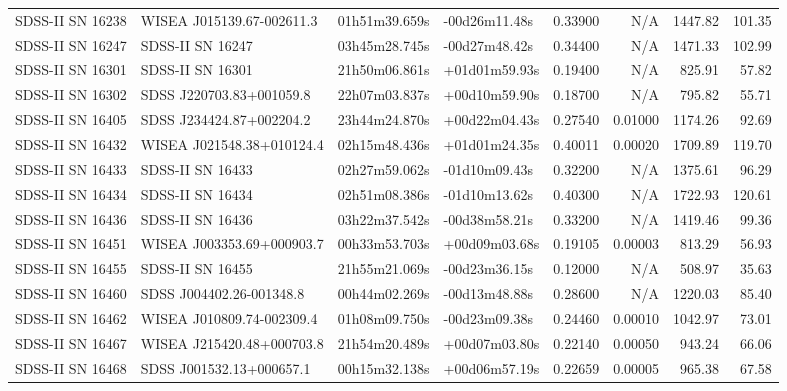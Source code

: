 \begin{longtable}{llllrrrr}
SDSS-II SN 16238 &       WISEA J015139.67-002611.3 &   01h51m39.659s &   -00d26m11.48s &  0.33900 &      N/A &  1447.82 &      101.35 \\
SDSS-II SN 16247 &                SDSS-II SN 16247 &   03h45m28.745s &   -00d27m48.42s &  0.34400 &      N/A &  1471.33 &      102.99 \\
SDSS-II SN 16301 &                SDSS-II SN 16301 &   21h50m06.861s &   +01d01m59.93s &  0.19400 &      N/A &   825.91 &       57.82 \\
SDSS-II SN 16302 &        SDSS J220703.83+001059.8 &   22h07m03.837s &   +00d10m59.90s &  0.18700 &      N/A &   795.82 &       55.71 \\
SDSS-II SN 16405 &        SDSS J234424.87+002204.2 &   23h44m24.870s &   +00d22m04.43s &  0.27540 &  0.01000 &  1174.26 &       92.69 \\
SDSS-II SN 16432 &       WISEA J021548.38+010124.4 &   02h15m48.436s &   +01d01m24.35s &  0.40011 &  0.00020 &  1709.89 &      119.70 \\
SDSS-II SN 16433 &                SDSS-II SN 16433 &   02h27m59.062s &   -01d10m09.43s &  0.32200 &      N/A &  1375.61 &       96.29 \\
SDSS-II SN 16434 &                SDSS-II SN 16434 &   02h51m08.386s &   -01d10m13.62s &  0.40300 &      N/A &  1722.93 &      120.61 \\
SDSS-II SN 16436 &                SDSS-II SN 16436 &   03h22m37.542s &   -00d38m58.21s &  0.33200 &      N/A &  1419.46 &       99.36 \\
SDSS-II SN 16451 &       WISEA J003353.69+000903.7 &   00h33m53.703s &   +00d09m03.68s &  0.19105 &  0.00003 &   813.29 &       56.93 \\
SDSS-II SN 16455 &                SDSS-II SN 16455 &   21h55m21.069s &   -00d23m36.15s &  0.12000 &      N/A &   508.97 &       35.63 \\
SDSS-II SN 16460 &        SDSS J004402.26-001348.8 &   00h44m02.269s &   -00d13m48.88s &  0.28600 &      N/A &  1220.03 &       85.40 \\
SDSS-II SN 16462 &       WISEA J010809.74-002309.4 &   01h08m09.750s &   -00d23m09.38s &  0.24460 &  0.00010 &  1042.97 &       73.01 \\
SDSS-II SN 16467 &       WISEA J215420.48+000703.8 &   21h54m20.489s &   +00d07m03.80s &  0.22140 &  0.00050 &   943.24 &       66.06 \\
SDSS-II SN 16468 &        SDSS J001532.13+000657.1 &   00h15m32.138s &   +00d06m57.19s &  0.22659 &  0.00005 &   965.38 &       67.58 \\

\end{longtable}
